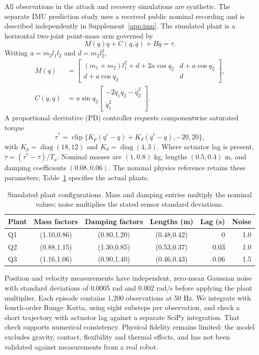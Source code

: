 All observations in the attack and recovery simulations are synthetic. The separate IMU prediction study uses a received public nominal recording and is described independently in Supplement~\ref{app:imu}. The simulated plant is a horizontal two-joint point-mass arm governed by
\begin{equation}
 M(q)\ddot q+C(q,\dot q)+B\dot q=\tau.
\end{equation}
Writing $a=m_2l_1l_2$ and $d=m_2l_2^2$,
\begin{align}
 M(q)&=\begin{bmatrix}(m_1+m_2)l_1^2+d+2a\cos q_2&d+a\cos q_2\\d+a\cos q_2&d\end{bmatrix},\\
 C(q,\dot q)&=a\sin q_2\begin{bmatrix}-2\dot q_1\dot q_2-\dot q_2^2\\\dot q_1^2\end{bmatrix}.
\end{align}
A proportional--derivative (PD) controller requests componentwise saturated torque
\begin{equation}
 \tau^*=\operatorname{clip}\{K_p(q^c-q)+K_d(\dot q^c-\dot q),-20,20\},
\end{equation}
with $K_p=\operatorname{diag}(18,12)$ and $K_d=\operatorname{diag}(4,3)$. Where actuator lag is present, $\dot\tau=(\tau^*-\tau)/T_a$. Nominal masses are $(1,0.8)$ kg, lengths $(0.5,0.4)$ m, and damping coefficients $(0.08,0.06)$. The nominal physics reference retains these parameters; Table~\ref{tab:plants} specifies the actual plants.

\begin{table}[htbp]\centering\small
\caption{Simulated plant configurations. Mass and damping entries multiply the nominal values; noise multiplies the stated sensor standard deviations.}\label{tab:plants}
\setlength{\tabcolsep}{5pt}
\begin{tabular}{lcccrr}\toprule
Plant & Mass factors & Damping factors & Lengths (m) & Lag (s) & Noise\\\midrule
Q1 & (1.10,0.86) & (0.80,1.20) & (0.48,0.42) & 0 & 1.0\\
Q2 & (0.88,1.15) & (1.30,0.85) & (0.53,0.37) & 0.03 & 1.0\\
Q3 & (1.16,1.06) & (0.90,1.40) & (0.46,0.43) & 0.06 & 1.5\\\bottomrule
\end{tabular}
\end{table}

Position and velocity measurements have independent, zero-mean Gaussian noise with standard deviations of 0.0005 rad and 0.002 rad/s before applying the plant multiplier. Each episode contains 1,200 observations at 50 Hz. We integrate with fourth-order Runge--Kutta, using eight substeps per observation, and check a short trajectory with actuator lag against a separate SciPy integration. That check supports numerical consistency. Physical fidelity remains limited: the model excludes gravity, contact, flexibility and thermal effects, and has not been validated against measurements from a real robot.

